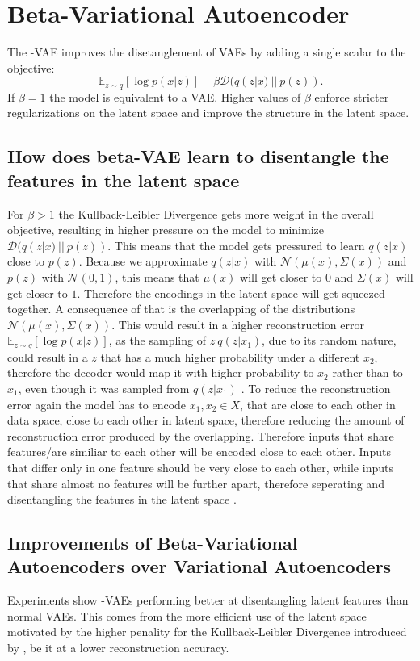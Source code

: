 \documentclass[a4paper]{IEEEtran}
\begin{document}
\section{Beta-Variational Autoencoder}
The \textbeta -VAE improves the disetanglement of VAEs by adding a single scalar to the objective:
\begin{equation}
	\mathbb{E}_{z \sim q}\left[ \log p(x|z) \right] - \beta \mathcal{D}(q(z|x) \ || \ p(z)).
\end{equation}
If $\beta = 1$ the model is equivalent to a VAE. Higher values of $\beta$ enforce stricter regularizations on the latent space and improve the structure in the latent space. 
\subsection{How does beta-VAE learn to disentangle the features in the latent space}
For $\beta > 1$ the Kullback-Leibler Divergence gets more weight in the overall objective, resulting in higher pressure on the model to minimize $\mathcal{D}(q(z|x) \ || \ p(z))$. This means that the model gets pressured to learn $q(z|x)$ close to $p(z)$. Because we approximate $q(z|x)$ with $\mathcal{N}(\mu(x), \Sigma(x))$ and $p(z)$ with $\mathcal{N}(0, 1)$, this means that $\mu(x)$ will get closer to $0$ and $\Sigma(x)$ will get closer to $1$. Therefore the encodings in the latent space will get squeezed together. A consequence of that is the overlapping of the distributions $\mathcal{N}(\mu(x), \Sigma(x))$. This would result in a higher reconstruction error $\mathbb{E}_{z \sim q}\left[ \log p(x|z) \right]$, as the sampling of $z ~ q(z|x_1)$, due to its random nature, could result in a $z$ that has a much higher probability under a different $x_2$, therefore the decoder would map it with higher probability to $x_2$ rather than to $x_1$, even though it was sampled from $q(z|x_1)$ \cite{burgess2018understanding}. To reduce the reconstruction error again the model has to encode $x_1, x_2 \in X$, that are close to each other in data space, close to each other in latent space, therefore reducing the amount of reconstruction error produced by the overlapping. Therefore inputs that share features/are similiar to each other will be encoded close to each other. Inputs that differ only in one feature should be very close to each other, while inputs that share almost no features will be further apart, therefore seperating and disentangling the features in the latent space \cite{burgess2018understanding}. 

\subsection{Improvements of Beta-Variational Autoencoders over Variational Autoencoders}
Experiments show \textbeta -VAEs performing better at disentangling latent features than normal VAEs. This comes from the more efficient use of the latent space motivated by the higher penality for the Kullback-Leibler Divergence introduced by \textbeta, be it at a lower reconstruction accuracy.
\end{document}
